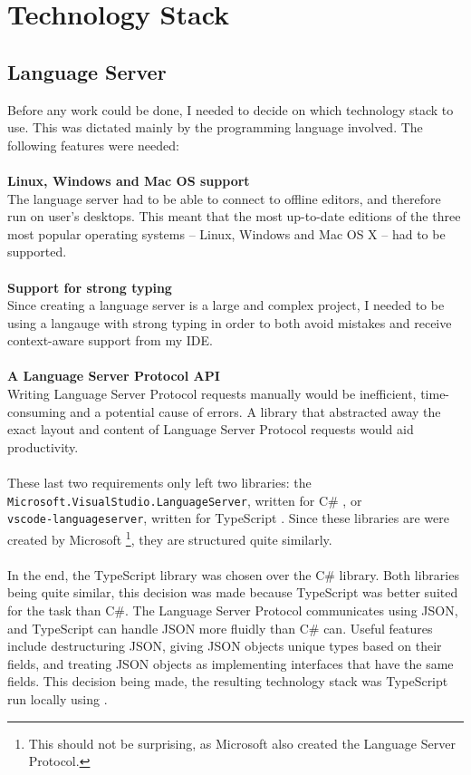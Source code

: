 \documentclass[../main.tex]{subfiles}
\begin{document}
\section{Technology Stack}
\subsection{Language Server}
Before any work could be done, I needed to decide on which technology stack to use. This was dictated mainly by the programming language involved. The following features were needed:
\\
\\
\textbf{Linux, Windows and Mac OS support} \\
The language server had to be able to connect to offline editors, and therefore run on user's desktops. This meant that the most up-to-date editions of the three most popular operating systems -- Linux, Windows and Mac OS X -- had to be supported.
\\
\\
\textbf{Support for strong typing} \\
Since creating a language server is a large and complex project, I needed to be using a langauge with strong typing in order to both avoid mistakes and receive context-aware support from my IDE.
\\
\\
\textbf{A Language Server Protocol API} \\
Writing Language Server Protocol requests manually would be inefficient, time-consuming and a potential cause of errors. A library that abstracted away the exact layout and content of Language Server Protocol requests would aid productivity.
\\ 
\\
These last two requirements only left two libraries: the \\ 
\texttt{Microsoft.VisualStudio.LanguageServer}, written for C\# \cite{visual_studio_language_server}, or \\ 
\texttt{vscode-languageserver}, written for TypeScript \cite{vsc_langserver_docs}. Since these libraries are were created by Microsoft \footnote{This should not be surprising, as Microsoft also created the Language Server Protocol.}, they are structured quite similarly. 
\\
\\
In the end, the TypeScript library was chosen over the C\# library. Both libraries being quite similar, this decision was made because TypeScript was better suited for the task than C\#. The Language Server Protocol communicates using JSON, and TypeScript can handle JSON more fluidly than C\# can. Useful features include destructuring JSON, giving JSON objects unique types based on their fields, and treating JSON objects as implementing interfaces that have the same fields. This decision being made, the resulting technology stack was TypeScript run locally using . 
\end{document}
